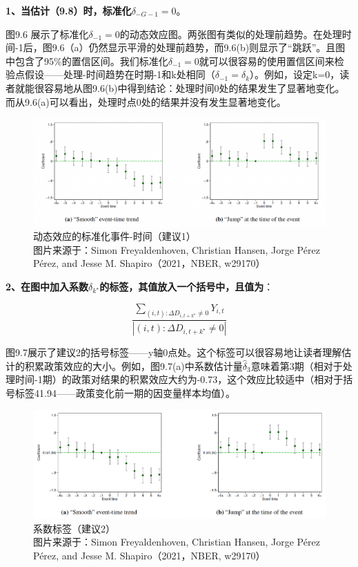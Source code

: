 \documentclass[cn,12pt,math=newtx,citestyle=gb7714-2015,bibstyle=gb7714-2015]{elegantbook}
\begin{document}
\textbf{1、当估计（9.8）时，标准化$\delta_{-G-1}=0$}。

图9.6 展示了标准化$\delta_{-1}=0$的动态效应图。两张图有类似的处理前趋势。在处理时间-1后，图9.6（a）仍然显示平滑的处理前趋势，而9.6(b)则显示了“跳跃”。且图中包含了95\%的置信区间。我们标准化$\delta_{-1}=0$就可以很容易的使用置信区间来检验点假设——处理-时间趋势在时期-1和k处相同（$\delta_{-1}=\delta_k$）。例如，设定k=0，读者就能很容易地从图9.6(b)中得到结论：处理时间0处的结果发生了显著地变化。而从9.6(a)可以看出，处理时点0处的结果并没有发生显著地变化。

\begin{figure}[tbph]
	\centering
	\includegraphics[width=1\linewidth]{sug1}
	\caption{动态效应的标准化事件-时间（建议1）\\ 图片来源于：Simon Freyaldenhoven, Christian Hansen, Jorge Pérez Pérez, and Jesse M. Shapiro（2021，NBER, w29170）}
	\label{fig:sug1}
\end{figure}


\textbf{2、在图中加入系数$\delta_{k^\star}$的标签，其值放入一个括号中，且值为}：

\begin{equation}
	\frac{\sum_{(i,t):\Delta D_{i,t+k^\star} \neq 0}Y_{i,t}}{|(i,t):\Delta D_{i,t+k^\star} \neq 0|}
\end{equation}
	
	图9.7展示了建议2的括号标签——y轴0点处。这个标签可以很容易地让读者理解估计的积累政策效应的大小。例如，图9.7(a)中系数估计量$\hat{\delta}_3$意味着第3期（相对于处理时间-1期）的政策对结果的积累效应大约为-0.73，这个效应比较适中（相对于括号标签41.94——政策变化前一期的因变量样本均值）。
	
	\begin{figure}[tbph]
		\centering
		\includegraphics[width=1\linewidth]{sug2}
		\caption{系数标签（建议2）\\ 图片来源于：Simon Freyaldenhoven, Christian Hansen, Jorge Pérez Pérez, and Jesse M. Shapiro（2021，NBER, w29170）}
		\label{fig:sug2}
	\end{figure}
	
\end{document}
